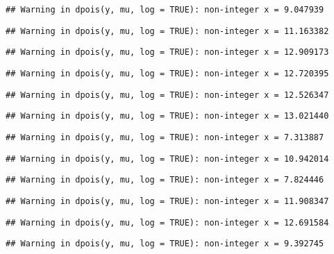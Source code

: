 \documentclass[
]{article}
\begin{document}
\begin{verbatim}
## Warning in dpois(y, mu, log = TRUE): non-integer x = 9.047939
\end{verbatim}

\begin{verbatim}
## Warning in dpois(y, mu, log = TRUE): non-integer x = 11.163382
\end{verbatim}

\begin{verbatim}
## Warning in dpois(y, mu, log = TRUE): non-integer x = 12.909173
\end{verbatim}

\begin{verbatim}
## Warning in dpois(y, mu, log = TRUE): non-integer x = 12.720395
\end{verbatim}

\begin{verbatim}
## Warning in dpois(y, mu, log = TRUE): non-integer x = 12.526347
\end{verbatim}

\begin{verbatim}
## Warning in dpois(y, mu, log = TRUE): non-integer x = 13.021440
\end{verbatim}

\begin{verbatim}
## Warning in dpois(y, mu, log = TRUE): non-integer x = 7.313887
\end{verbatim}

\begin{verbatim}
## Warning in dpois(y, mu, log = TRUE): non-integer x = 10.942014
\end{verbatim}

\begin{verbatim}
## Warning in dpois(y, mu, log = TRUE): non-integer x = 7.824446
\end{verbatim}

\begin{verbatim}
## Warning in dpois(y, mu, log = TRUE): non-integer x = 11.908347
\end{verbatim}

\begin{verbatim}
## Warning in dpois(y, mu, log = TRUE): non-integer x = 12.691584
\end{verbatim}

\begin{verbatim}
## Warning in dpois(y, mu, log = TRUE): non-integer x = 9.392745
\end{verbatim}
\end{document}
